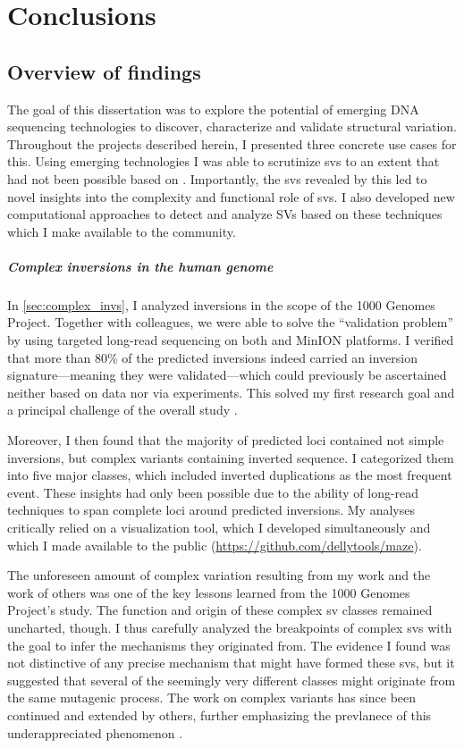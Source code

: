 \chapter{Conclusions}
\label{sec:conclusions}

\section{Overview of findings}
\label{sec:findings}

The goal of this dissertation was to explore the potential of emerging DNA
sequencing technologies to discover, characterize and validate structural
variation. Throughout the projects described herein, I presented three concrete
use cases for this. Using emerging technologies I was able to scrutinize \acp{sv}
to an extent that had not been possible based on \mps. Importantly, the \acp{sv}
revealed by this led to novel insights into the complexity and functional role
of \acp{sv}. I also developed new computational approaches to detect and analyze
SVs based on these techniques which I make available to the community.

\paragraph{Complex inversions in the human genome}
In \cref{sec:complex_invs}, I analyzed inversions in the scope of the 1000
Genomes Project. Together with colleagues, we were able to solve the
``validation problem'' by using targeted long-read sequencing on both \pacbio
and \ont MinION platforms. I verified that more than 80\% of the predicted
inversions indeed carried an inversion signature---meaning they were
validated---which could previously be ascertained neither based on \mps data nor
via \pcr experiments. This solved my first research goal and a principal
challenge of the overall study \citep{Sudmant2015}.

Moreover, I then found that
the majority of predicted loci contained not simple inversions, but complex
variants containing inverted sequence. I categorized them into five major
classes, which included inverted duplications as the most frequent event. These
insights had only been possible due to the ability of long-read techniques to
span complete loci around predicted inversions. My analyses critically relied on
a visualization tool, which I developed simultaneously and which I made
available to the public (\url{https://github.com/dellytools/maze}).

The unforeseen amount of complex variation resulting from my work and the work
of others was one of the key lessons learned from the 1000 Genomes Project's \sv
study. The function and origin of these complex sv classes remained uncharted,
though. I thus carefully analyzed the breakpoints of complex \acp{sv} with the
goal to infer the mechanisms they originated from. The evidence I found was not
distinctive of any precise mechanism that might have formed these \acp{sv}, but
it suggested that several of the seemingly very different classes might
originate from the same mutagenic process. The work on complex variants has
since been continued and extended by others, further emphasizing the prevlanece
of this underappreciated phenomenon \citep{Collins2017}.

